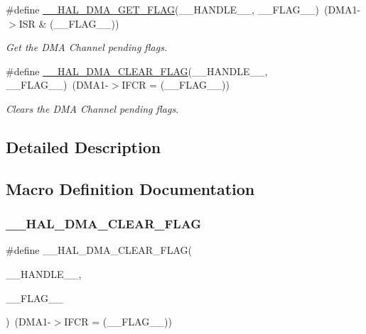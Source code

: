 \begin{DoxyCompactItemize}
\#define \hyperlink{group___d_m_a_ex___exported___macros_ga798d4b3b3fbd32b95540967bb35b35be}{\+\_\+\+\_\+\+H\+A\+L\+\_\+\+D\+M\+A\+\_\+\+G\+E\+T\+\_\+\+F\+L\+AG}(\+\_\+\+\_\+\+H\+A\+N\+D\+L\+E\+\_\+\+\_\+,  \+\_\+\+\_\+\+F\+L\+A\+G\+\_\+\+\_\+)~(D\+M\+A1-\/$>$I\+SR \& (\+\_\+\+\_\+\+F\+L\+A\+G\+\_\+\+\_\+))
\begin{DoxyCompactList}\small\item\em Get the D\+MA Channel pending flags. \end{DoxyCompactList}\item 
\#define \hyperlink{group___d_m_a_ex___exported___macros_gabc041fb1c85ea7a3af94e42470ef7f2a}{\+\_\+\+\_\+\+H\+A\+L\+\_\+\+D\+M\+A\+\_\+\+C\+L\+E\+A\+R\+\_\+\+F\+L\+AG}(\+\_\+\+\_\+\+H\+A\+N\+D\+L\+E\+\_\+\+\_\+,  \+\_\+\+\_\+\+F\+L\+A\+G\+\_\+\+\_\+)~(D\+M\+A1-\/$>$I\+F\+CR = (\+\_\+\+\_\+\+F\+L\+A\+G\+\_\+\+\_\+))
\begin{DoxyCompactList}\small\item\em Clears the D\+MA Channel pending flags. \end{DoxyCompactList}\end{DoxyCompactItemize}


\subsection{Detailed Description}


\subsection{Macro Definition Documentation}
\mbox{\label{group___d_m_a_ex___exported___macros_gabc041fb1c85ea7a3af94e42470ef7f2a}} 
\subsubsection{\texorpdfstring{\+\_\+\+\_\+\+H\+A\+L\+\_\+\+D\+M\+A\+\_\+\+C\+L\+E\+A\+R\+\_\+\+F\+L\+AG}{\_\_HAL\_DMA\_CLEAR\_FLAG}}
{\footnotesize\ttfamily \#define \+\_\+\+\_\+\+H\+A\+L\+\_\+\+D\+M\+A\+\_\+\+C\+L\+E\+A\+R\+\_\+\+F\+L\+AG(\begin{DoxyParamCaption}\item[{}]{\+\_\+\+\_\+\+H\+A\+N\+D\+L\+E\+\_\+\+\_\+,  }\item[{}]{\+\_\+\+\_\+\+F\+L\+A\+G\+\_\+\+\_\+ }\end{DoxyParamCaption})~(D\+M\+A1-\/$>$I\+F\+CR = (\+\_\+\+\_\+\+F\+L\+A\+G\+\_\+\+\_\+))}



